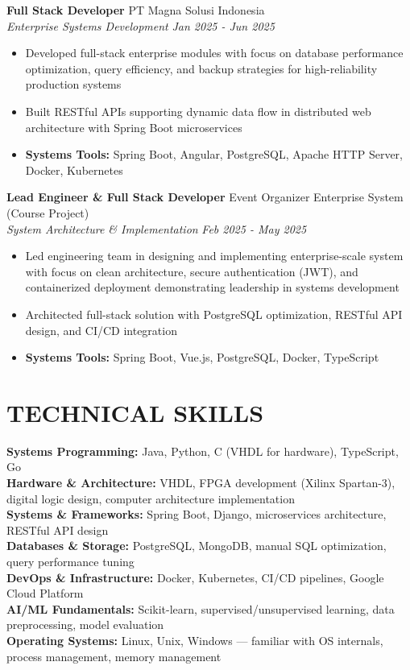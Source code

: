 \documentclass[10pt,a4paper]{article}
\newcommand{\experienceheader}[4]{
    \textbf{#1} \hfill #2 \\
    \textit{#3} \hfill \textit{#4}
}
\begin{document}
\vspace{4pt}

\experienceheader{Full Stack Developer}{PT Magna Solusi Indonesia}{Enterprise Systems Development}{Jan 2025 - Jun 2025}
\begin{itemize}[leftmargin=*, itemsep=2pt, topsep=2pt]
    \item Developed full-stack enterprise modules with focus on database performance optimization, query efficiency, and backup strategies for high-reliability production systems
    \item Built RESTful APIs supporting dynamic data flow in distributed web architecture with Spring Boot microservices
    \item \textbf{Systems Tools:} Spring Boot, Angular, PostgreSQL, Apache HTTP Server, Docker, Kubernetes
\end{itemize}

\vspace{4pt}

\experienceheader{Lead Engineer \& Full Stack Developer}{Event Organizer Enterprise System (Course Project)}{System Architecture \& Implementation}{Feb 2025 - May 2025}
\begin{itemize}[leftmargin=*, itemsep=2pt, topsep=2pt]
    \item Led engineering team in designing and implementing enterprise-scale system with focus on clean architecture, secure authentication (JWT), and containerized deployment demonstrating leadership in systems development
    \item Architected full-stack solution with PostgreSQL optimization, RESTful API design, and CI/CD integration
    \item \textbf{Systems Tools:} Spring Boot, Vue.js, PostgreSQL, Docker, TypeScript
\end{itemize}

\section*{TECHNICAL SKILLS}

\textbf{Systems Programming:} Java, Python, C (VHDL for hardware), TypeScript, Go \\
\textbf{Hardware \& Architecture:} VHDL, FPGA development (Xilinx Spartan-3), digital logic design, computer architecture implementation \\
\textbf{Systems \& Frameworks:} Spring Boot, Django, microservices architecture, RESTful API design \\
\textbf{Databases \& Storage:} PostgreSQL, MongoDB, manual SQL optimization, query performance tuning \\
\textbf{DevOps \& Infrastructure:} Docker, Kubernetes, CI/CD pipelines, Google Cloud Platform \\
\textbf{AI/ML Fundamentals:} Scikit-learn, supervised/unsupervised learning, data preprocessing, model evaluation \\
\textbf{Operating Systems:} Linux, Unix, Windows — familiar with OS internals, process management, memory management
\end{document}
